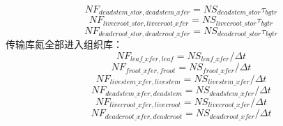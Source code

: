 \begin{equation}
  NF_{deadstem\_{stor},deadstem\_{xfer}}=NS_{deadstem\_{stor}}\tau_{bgtr}
\end{equation}
\begin{equation}
  NF_{livecroot\_{stor},livecroot\_{xfer}}=NS_{livecroot\_{stor}}\tau_{bgtr}
\end{equation}
\begin{equation}
  NF_{deadcroot\_{stor},deadcroot\_{xfer}}=NS_{deadcroot\_{stor}}\tau_{bgtr}
\end{equation}
传输库氮全部进入组织库：
\begin{equation}
  NF_{leaf\_{xfer},leaf}=NS_{leaf\_{xfer}}/\Delta t
\end{equation}
\begin{equation}
  NF_{froot\_{xfer},froot}=NS_{froot\_{xfer}}/\Delta t
\end{equation}
\begin{equation}
  NF_{livestem\_{xfer},livestem}=NS_{livestem\_{xfer}}/\Delta t
\end{equation}
\begin{equation}
  NF_{deadstem\_{xfer},deadstem}=NS_{deadstem\_{xfer}}/\Delta t
\end{equation}
\begin{equation}
  NF_{livecroot\_{xfer},livecroot}=NS_{livecroot\_{xfer}}/\Delta t
\end{equation}
\begin{equation}
  NF_{deadcroot\_{xfer},deadcroot}=NS_{deadcroot\_{xfer}}/\Delta t
\end{equation}


